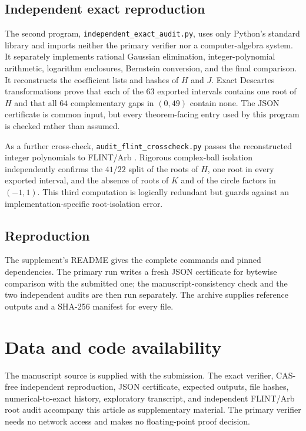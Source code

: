 \documentclass[preprint,12pt]{elsarticle}
\theoremstyle{definition}
\begin{document}
\subsection{Independent exact reproduction}

The second program, \texttt{independent\_exact\_audit.py}, uses only Python's
standard library and imports neither the primary verifier nor a
computer-algebra system.  It separately implements rational Gaussian
elimination, integer-polynomial arithmetic, logarithm enclosures, Bernstein
conversion, and the final comparison.  It reconstructs the coefficient lists
and hashes of $H$ and $J$.  Exact Descartes transformations prove that each of
the $63$ exported intervals contains one root of $H$ and that all $64$
complementary gaps in $(0,49)$ contain none.  The JSON certificate is common
input, but every theorem-facing entry used by this program is checked rather
than assumed.

As a further cross-check, \texttt{audit\_flint\_crosscheck.py} passes the
reconstructed integer polynomials to FLINT/Arb \cite{Johansson2017}.
Rigorous complex-ball isolation independently confirms the $41/22$ split of
the roots of $H$, one root in every exported interval, and the absence of
roots of $K$ and of the circle factors in $(-1,1)$.  This third computation is
logically redundant but guards against an implementation-specific
root-isolation error.

\subsection{Reproduction}

The supplement's README gives the complete commands and pinned dependencies.
The primary run writes a fresh JSON certificate for bytewise comparison with
the submitted one; the manuscript-consistency check and the two independent
audits are then run separately.  The archive supplies reference outputs and a
SHA-256 manifest for every file.

\section*{Data and code availability}

The manuscript source is supplied with the submission.  The exact verifier,
CAS-free independent reproduction, JSON certificate, expected outputs, file
hashes, numerical-to-exact history, exploratory transcript, and independent
FLINT/Arb root audit accompany this article as supplementary material.  The
primary verifier needs no network access and makes no floating-point proof
decision.
\end{document}

